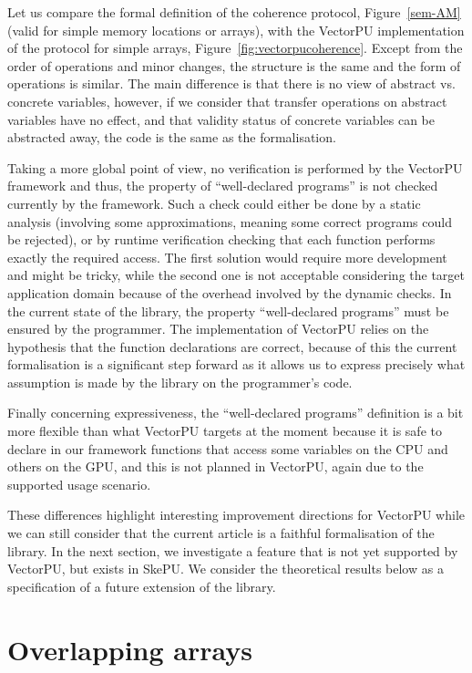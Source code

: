 \documentclass[preprint,12pt]{elsarticle}
\begin{document}
Let us compare the formal definition of the coherence protocol, Figure~\ref{sem-AM} (valid for simple memory locations or arrays), with the VectorPU implementation of the protocol for simple arrays, Figure~\ref{fig:vectorpucoherence}. Except from the order of operations and minor changes, the structure is the same and the form of operations is similar. The main difference is that there is no view of abstract vs. concrete variables, however, if we consider that transfer operations on abstract variables have no effect, and that validity status of concrete variables can be abstracted away, the code is  the same as the formalisation. 

Taking a more global point of view, no verification is performed by the VectorPU framework and thus, the property of ``well-declared programs'' is not checked currently by the framework. Such a check could either be done by a static analysis (involving some approximations, meaning  some correct programs could be rejected), or by runtime verification checking that each function performs exactly the required access. The first solution would require more development and might be tricky, while the second one is not acceptable considering the target application domain because of the overhead involved by the dynamic checks. In the current state of the library, the property ``well-declared programs''  must be ensured by the programmer. The implementation of VectorPU relies on the hypothesis that the function declarations are correct, because of this the current formalisation is a significant step forward as it allows us to express precisely what assumption is made by the library on the programmer's code.

Finally concerning expressiveness, the ``well-declared programs'' definition is a bit more flexible than what VectorPU targets at the moment because it is safe to declare in our framework functions that access some variables on the CPU and others on the GPU, and this is not planned in VectorPU, again due to the supported usage scenario.

These differences highlight interesting improvement directions for VectorPU while we can still consider that the current article  is a faithful formalisation of the library. In the next section, we investigate a feature that is not yet supported by VectorPU, but exists in SkePU. We consider the theoretical results below as a specification of a future extension of the library.

\section{Overlapping arrays}
\end{document}
